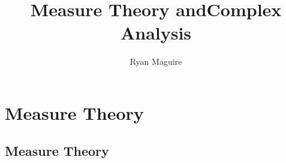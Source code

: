 \documentclass[crop=false,class=book,oneside]{standalone}                      %
\begin{document}
    \title{Measure Theory andComplex Analysis}
    \author{Ryan Maguire}
    \date{\vspace{-5ex}}
    \maketitle
    \tableofcontents
    \clearpage
    \chapter*{Measure Theory}
    \vspace{10ex}
    \setcounter{chapter}{1}
    \section{Measure Theory}
\end{document}
